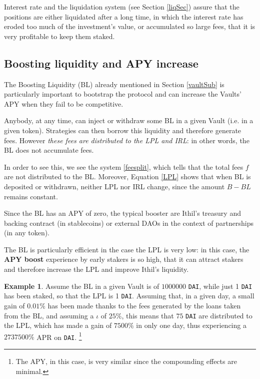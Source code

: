 \documentclass[a4paper,10 pt]{article}
\theoremstyle{definition}
\newtheorem{example}{Example}
\begin{document}
Interest rate and the liquidation system (see Section \ref{liqSec}) assure that the positions are either liquidated after a long time, in which the interest rate has eroded too much of the investment's value, or accumulated so large fees, that it is very profitable to keep them staked.

\subsection{Boosting liquidity and APY increase}\label{glSub}

The Boosting Liquidity (BL) already mentioned in Section \ref{vaultSub} is particularly important to bootstrap the protocol and can increase the Vaults' APY when they fail to be competitive.

Anybody, at any time, can inject or withdraw some BL in a given Vault (i.e. in a given token). Strategies can then borrow this liquidity and therefore generate fees. However {\it these fees are distributed to the LPL and IRL}: in other words, the BL does not accumulate fees. 

In order to see this, we see the system \eqref{feesplit}, which tells that the total fees $f$ are not distributed to the BL. Moreover, Equation \eqref{LPL} shows that when BL is deposited or withdrawn, neither LPL nor IRL change, since the amount $B - BL$ remains constant.

Since the BL has an APY of zero, the typical booster are Ithil's treasury and backing contract (in stablecoins) or external DAOs in the context of partnerships (in any token).

The BL is particularly efficient in the case the LPL is very low: in this case, the {\bf APY boost} experience by early stakers is so high, that it can attract stakers and therefore increase the LPL and improve Ithil's liquidity.

\begin{example}\label{bigapy}
Assume the BL in a given Vault is of $1000000$ \verb|DAI|, while just 1 \verb|DAI| has been staked, so that the LPL is 1 \verb|DAI|. Assuming that, in a given day, a small gain of $0.01\%$ has been made thanks to the fees generated by the loans taken from the BL, and assuming a $\iota$ of $25\%$, this means that $75$ \verb|DAI| are distributed to the LPL, which has made a gain of $7500\%$ in only one day, thus experiencing a $2737500\%$ APR on \verb|DAI|. \footnote{The APY, in this case, is very similar since the compounding effects are minimal.}
\end{example}
\end{document}

